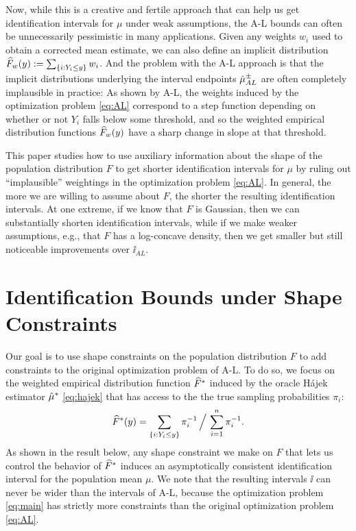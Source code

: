 \documentclass{article}
\theoremstyle{plain}
\theoremstyle{definition}
\theoremstyle{remark}
\begin{document}
Now, while this is a creative and fertile approach that can help us get identification intervals
for $\mu$ under weak assumptions, the A-L bounds can often be unnecessarily pessimistic in many
applications. Given any weights $w_i$ used to obtain a corrected mean estimate, we
can also define an implicit distribution $\widehat{F}_w(y) := \sum_{\left\{i : Y_i \leq y\right\}} w_i$.
And the problem with the A-L approach is that the implicit distributions underlying the
interval endpoints $\hat{\mu}_{AL}^{\pm}$ are often completely implausible in practice:
As shown by A-L, the weights induced by the optimization problem \eqref{eq:AL} correspond
to a step function depending on whether or not $Y_i$ falls below some threshold, and
so the weighted empirical distribution functions $\widehat{F}_w(y)$ have a sharp change in
slope at that threshold.

This paper studies how to use auxiliary information about the shape of the population
distribution $F$ to get shorter identification intervals for $\mu$ by ruling out ``implausible''
weightings in the optimization problem \eqref{eq:AL}. In general, the more we are willing to assume
about $F$, the shorter the resulting identification intervals. At one extreme, if we know that $F$
is Gaussian, then we can substantially shorten identification intervals, while if we make weaker
assumptions, e.g., that $F$ has a log-concave density, then we get smaller but still noticeable
improvements over $\ii_{AL}$.

\section{Identification Bounds under Shape Constraints}

Our goal is to use shape constraints on the population distribution $F$ to add constraints
to the original optimization problem of A-L. To do so, we focus on the weighted empirical
distribution function $\widehat{F}^*$ induced by the oracle H\'ajek estimator $\hat{\mu}^*$ \eqref{eq:hajek}
that has access to the the true sampling probabilities $\pi_i$:
\begin{equation}
\label{eq:oracle_distr}
\widehat{F}^*(y) = \sum_{\left\{i : Y_i \leq y\right\}} \pi^{-1}_i \, \Big/ \, \sum_{i = 1}^n \pi^{-1}_i.
\end{equation}
As shown in the result below, any shape constraint we make on $F$ that lets us control the
behavior of $\widehat{F}^*$ induces an asymptotically consistent identification interval for
the population mean $\mu$.
We note that the resulting intervals $\ii$ can never be wider than the intervals of
A-L, because the optimization problem \eqref{eq:main} has strictly more constraints than
the original optimization problem \eqref{eq:AL}.
\end{document}
